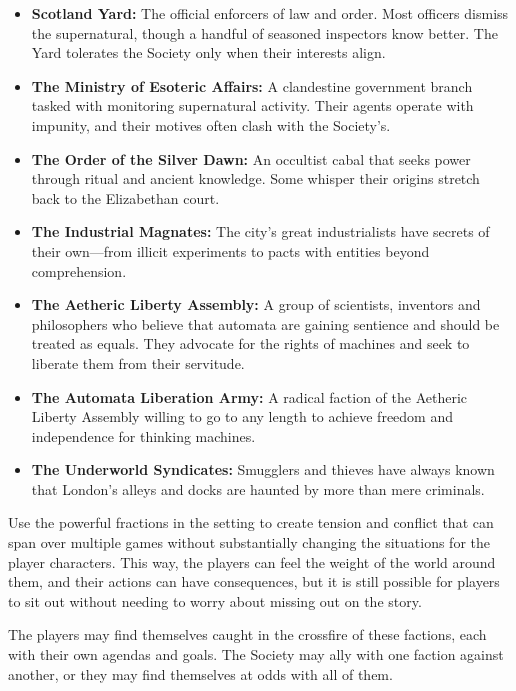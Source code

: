 \begin{itemize}\raggedright
    \item \textbf{Scotland Yard:} The official enforcers of law and order. Most officers dismiss the supernatural, though a handful of seasoned inspectors know better. The Yard tolerates the Society only when their interests align.
    
    \item \textbf{The Ministry of Esoteric Affairs:} A clandestine government branch tasked with monitoring supernatural activity. Their agents operate with impunity, and their motives often clash with the Society’s.
    
    \item \textbf{The Order of the Silver Dawn:} An occultist cabal that seeks power through ritual and ancient knowledge. Some whisper their origins stretch back to the Elizabethan court.
    
    \item \textbf{The Industrial Magnates:} The city’s great industrialists have secrets of their own—from illicit experiments to pacts with entities beyond comprehension.

    \item \textbf{The Aetheric Liberty Assembly:} A group of scientists, inventors and philosophers who believe that automata are gaining sentience and should be treated as equals. They advocate for the rights of machines and seek to liberate them from their servitude.
    
    \item \textbf{The Automata Liberation Army:} A radical faction of the Aetheric Liberty Assembly willing to go to any length to achieve freedom and independence for thinking machines.
    
    \item \textbf{The Underworld Syndicates:} Smugglers and thieves have always known that London’s alleys and docks are haunted by more than mere criminals.
\end{itemize}

Use the powerful fractions in the setting to create tension and conflict that can span over multiple games without substantially changing the situations for the player characters. This way, the players can feel the weight of the world around them, and their actions can have consequences, but it is still possible for players to sit out without needing to worry about missing out on the story.

The players may find themselves caught in the crossfire of these factions, each with their own agendas and goals. The Society may ally with one faction against another, or they may find themselves at odds with all of them.




